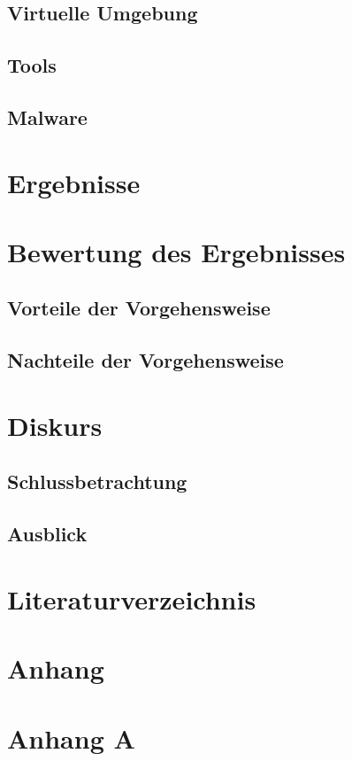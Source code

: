 \documentclass[12pt,oneside]{article}
\begin{document}
\subsection{Virtuelle Umgebung}
\subsection{Tools}
\subsection{Malware}
\newpage

\section{Ergebnisse}
\newpage

\section{Bewertung des Ergebnisses}
\subsection{Vorteile der Vorgehensweise}
\subsection{Nachteile der Vorgehensweise}
\newpage

\section{Diskurs}
\subsection{Schlussbetrachtung}
\subsection{Ausblick}
\newpage 

\section{Literaturverzeichnis}
\clearpage
\lhead{}
\printbibliography
{}
\newpage

\section{Anhang}
\appendix
\section{Anhang A} 





\clearpage

\end{document}
